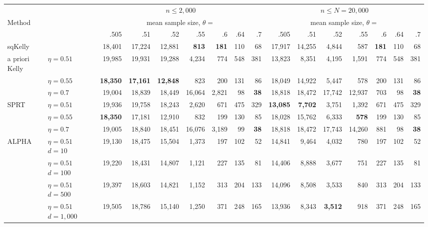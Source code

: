 \documentclass[12pt,runningheads]{llncs}
\begin{document}
{\begin{table}
\centering
\tiny
\begin{tabular}{ll|rrrrrrr|rrrrrrr}& & \multicolumn{7}{|c|}{$n \le2{,}000$} &  \multicolumn{7}{|c}{$n \le N=20{,}000$} \\ 
Method & & \multicolumn{7}{c|}{mean sample size, $\theta=$}  & \multicolumn{7}{|c}{mean sample size, $\theta=$ }\\ 
& & .505 & .51 & .52 & .55 & .6 & .64 & .7  & .505 & .51 & .52 & .55 & .6 & .64 & .7  \\ 
\hline
sqKelly  &  & 18,401  & 17,224  & 12,881  & \bf{813}  & \bf{181}  & 110  & 68   & 17,917  & 14,255  & 4,844  & 587  & \bf{181}  & 110  & 68  \\ 
\hline
a priori Kelly & $\eta=0.51$   & 19,985  & 19,931  & 19,288  & 4,234  & 774  & 548  & 381   & 13,823  & 8,351  & 4,195  & 1,591  & 774  & 548  & 381  \\ 
 & $\eta=0.55$   & \bf{18,350}  & \bf{17,161}  & \bf{12,848}  & 823  & 200  & 131  & 86   & 18,049  & 14,922  & 5,447  & 578  & 200  & 131  & 86  \\ 
 & $\eta=0.7$   & 19,004  & 18,839  & 18,449  & 16,064  & 2,821  & 98  & \bf{38}   & 18,818  & 18,472  & 17,742  & 12,937  & 703  & 98  & \bf{38}  \\ 
\hline
 SPRT & $\eta=0.51$  & 19,936  & 19,758  & 18,243  & 2,620  & 671  & 475  & 329   & \bf{13,085}  & \bf{7,702}  & 3,751  & 1,392  & 671  & 475  & 329  \\  
 & $\eta=0.55$  & \bf{18,350}  & 17,181  & 12,910  & 832  & 199  & 130  & 85   & 18,028  & 15,762  & 6,333  & \bf{578}  & 199  & 130  & 85  \\  
 & $\eta=0.7$  & 19,005  & 18,840  & 18,451  & 16,076  & 3,189  & 99  & \bf{38}   & 18,818  & 18,472  & 17,743  & 14,260  & 881  & 98  & \bf{38}  \\  
\hline
ALPHA & $\eta=0.51$ $d=10$ & 19,130  & 18,475  & 15,504  & 1,373  & 197  & 102  & 52  & 14,841  & 9,464  & 4,032  & 780  & 197  & 102  & 52  \\ 
 & $\eta=0.51$ $d=100$ & 19,220  & 18,431  & 14,807  & 1,121  & 227  & 135  & 81  & 14,406  & 8,888  & 3,677  & 751  & 227  & 135  & 81  \\ 
 & $\eta=0.51$ $d=500$ & 19,397  & 18,603  & 14,821  & 1,152  & 313  & 204  & 133  & 14,096  & 8,508  & 3,533  & 840  & 313  & 204  & 133  \\ 
 & $\eta=0.51$ $d=1{,}000$ & 19,505  & 18,786  & 15,140  & 1,250  & 371  & 248  & 165  & 13,936  & 8,343  & \bf{3,512}  & 918  & 371  & 248  & 165  \\ 

\end{tabular}
\end{table}}
\end{document}
